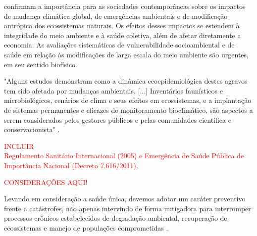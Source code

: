 \indent {} confirmam a importância para as sociedades contemporâneas sobre os impactos de mudança climática global, de emergências ambientais e de modificação antrópica dos ecossistemas naturais. Os efeitos desses impactos se estendem à integridade do meio ambiente e à saúde coletiva, além de afetar diretamente a economia. As avaliações sistemáticas de vulnerabilidade socioambiental e de saúde em relação às modificações de larga escala do meio ambiente são urgentes, em seu sentido biofísico. 

\begin{citacao}
"Alguns estudos demonstram como a dinâmica ecoepidemiológica destes agravos tem sido afetada por mudanças ambientais. [...] Inventários faunísticos e microbiológicos, cenários de clima e seus efeitos em ecossistemas, e a implantação de sistemas permanentes e eficazes de monitoramento bioclimático, são aspectos a serem considerados pelos gestores públicos e pelas comunidades científica e conservacionista" \cite[pg-2325]{Cubas2014Tratado}.
\end{citacao}

\textcolor{red}{INCLUIR\\Regulamento Sanitário Internacional (2005) e Emergência de Saúde Pública de
Importância Nacional (Decreto 7.616/2011).}

\begin{center}
\textcolor{red}{CONSIDERAÇÕES AQUI!}\\ 
\end{center}

\indent Levando em consideração a saúde única, devemos adotar um caráter preventivo frente a catástrofes, não apenas  intervindo de forma mitigadora para interromper processos crônicos estabelecidos de degradação ambiental, recuperação de ecossistemas e manejo de populações comprometidas \cite{Cubas2014Tratado}.


